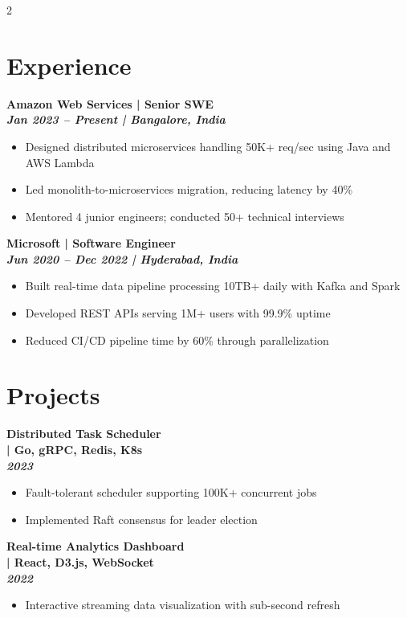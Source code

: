 \documentclass[a4paper,10pt]{article}
\newcommand{\runsubsection}[1]{\fontsize{10pt}{12pt}\selectfont\bfseries\color{subheadings}#1\normalfont}
\newcommand{\descript}[1]{\fontsize{9pt}{11pt}\selectfont\color{primary} | #1\normalfont}
\newcommand{\location}[1]{\fontsize{8pt}{10pt}\selectfont\color{datecolor}\textit{#1}\normalfont\vspace{1pt}}
\begin{document}
\begin{paracol}{2}
\switchcolumn

\section{Experience}
\runsubsection{Amazon Web Services}
\descript{Senior SWE}\\
\location{Jan 2023 -- Present | Bangalore, India}
\begin{itemize}[leftmargin=*, itemsep=-1pt, topsep=2pt]
\item \small Designed distributed microservices handling 50K+ req/sec using Java and AWS Lambda
\item \small Led monolith-to-microservices migration, reducing latency by 40\%
\item \small Mentored 4 junior engineers; conducted 50+ technical interviews
\end{itemize}
\vspace{4pt}

\runsubsection{Microsoft}
\descript{Software Engineer}\\
\location{Jun 2020 -- Dec 2022 | Hyderabad, India}
\begin{itemize}[leftmargin=*, itemsep=-1pt, topsep=2pt]
\item \small Built real-time data pipeline processing 10TB+ daily with Kafka and Spark
\item \small Developed REST APIs serving 1M+ users with 99.9\% uptime
\item \small Reduced CI/CD pipeline time by 60\% through parallelization
\end{itemize}
\vspace{4pt}

\section{Projects}
\runsubsection{Distributed Task Scheduler}\\
\descript{Go, gRPC, Redis, K8s}\\
\location{2023}
\begin{itemize}[leftmargin=*, itemsep=-1pt, topsep=2pt]
\item \small Fault-tolerant scheduler supporting 100K+ concurrent jobs
\item \small Implemented Raft consensus for leader election
\end{itemize}
\vspace{4pt}

\runsubsection{Real-time Analytics Dashboard}\\
\descript{React, D3.js, WebSocket}\\
\location{2022}
\begin{itemize}[leftmargin=*, itemsep=-1pt, topsep=2pt]
\item \small Interactive streaming data visualization with sub-second refresh
\end{itemize}

\end{paracol}
\end{document}
